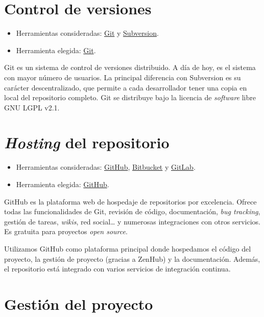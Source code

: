 
\section{Control de versiones}\label{control-de-versiones}

\begin{itemize}
\tightlist
\item
  Herramientas consideradas: \href{https://git-scm.com/}{Git} y
  \href{https://subversion.apache.org/}{Subversion}.
\item
  Herramienta elegida: \href{https://git-scm.com/}{Git}.
\end{itemize}

Git es un sistema de control de versiones distribuido. A día de hoy, es
el sistema con mayor número de usuarios. La principal diferencia con
Subversion es su carácter descentralizado, que permite a cada
desarrollador tener una copia en local del repositorio completo. Git
se distribuye bajo la licencia de \emph{software} libre GNU LGPL v2.1.

\section{\emph{Hosting} del repositorio}\label{hosting-del-repositorio}

\begin{itemize}
\tightlist
\item
  Herramientas consideradas: \href{https://github.com/}{GitHub},
  \href{https://bitbucket.org/}{Bitbucket} y
  \href{https://gitlab.com/}{GitLab}.
\item
  Herramienta elegida: \href{https://github.com/}{GitHub}.
\end{itemize}

GitHub es la plataforma web de hospedaje de repositorios por excelencia.
Ofrece todas las funcionalidades de Git, revisión de código,
documentación, \emph{bug tracking}, gestión de tareas, \emph{wikis}, red
social\ldots{} y numerosas integraciones con otros servicios. Es
gratuita para proyectos \emph{open source}.

Utilizamos GitHub como plataforma principal donde hospedamos el código
del proyecto, la gestión de proyecto (gracias a ZenHub) y la
documentación. Además, el repositorio está integrado con varios
servicios de integración continua.

\section{Gestión del proyecto}\label{gestion-del-proyecto}

